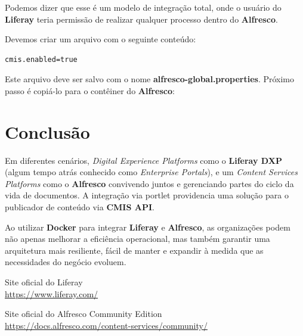 \documentclass[a4paper,11pt]{article}
\begin{document}
Podemos dizer que esse é um modelo de integração total, onde o usuário do \textbf{Liferay} teria permissão de realizar qualquer processo dentro do \textbf{Alfresco}.

Devemos criar um arquivo com o seguinte conteúdo:
\begin{lstlisting}
cmis.enabled=true
\end{lstlisting}

Este arquivo deve ser salvo com o nome \textbf{alfresco-global.properties}. Próximo passo é copiá-lo para o contêiner do \textbf{Alfresco}: \\

\section{Conclusão}
Em diferentes cenários, \textit{Digital Experience Platforms} como o \textbf{Liferay DXP} (algum tempo atrás conhecido como \textit{Enterprise Portals}), e um \textit{Content Services Platforms} como o \textbf{Alfresco} convivendo juntos e gerenciando partes do ciclo da vida de documentos. A integração via portlet providencia uma solução para o publicador de conteúdo via \textbf{CMIS API}.

Ao utilizar \textbf{Docker} para integrar \textbf{Liferay} e \textbf{Alfresco}, as organizações podem não apenas melhorar a eficiência operacional, mas também garantir uma arquitetura mais resiliente, fácil de manter e expandir à medida que as necessidades do negócio evoluem. 



\begin{thebibliography}{7}
  Site oficial do Liferay \\
  \url{https://www.liferay.com/}

  Site oficial do Alfresco Community Edition \\
  \url{https://docs.alfresco.com/content-services/community/}
  
  
\end{thebibliography}
\end{document}
